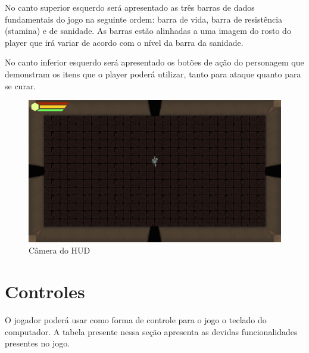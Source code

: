 No canto superior esquerdo será apresentado as três barras de dados fundamentais do jogo na seguinte ordem: barra de vida, barra de resistência (stamina) e de sanidade. As barras estão alinhadas a uma imagem do rosto do player que irá variar de acordo com o nível da barra da sanidade.

No canto inferior esquerdo será apresentado os botões de ação do personagem que demonstram os itens que o player poderá utilizar, tanto para ataque quanto para se curar.

\begin{figure}[!h]
    \label{hud}
    \centering
    \caption{Câmera do HUD}
    \includegraphics[keepaspectratio=true,scale=0.35]{images/HUD.jpg}
\end{figure}
\vspace*{7cm}
\section{\label{ctrl} Controles}
O jogador poderá usar como forma de controle para o jogo o teclado do computador. A tabela presente nessa seção apresenta as devidas funcionalidades presentes no jogo.

